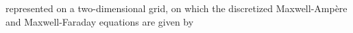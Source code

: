 \documentclass[]{report}
\begin{document}
represented on a two-dimensional grid, 
on which the discretized
Maxwell-Amp\`ere and Maxwell-Faraday equations are given by
%
%
%
%
%
%
\end{document}
